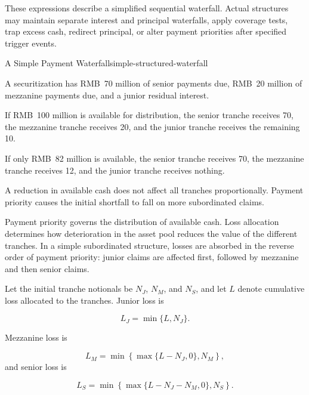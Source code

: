 These expressions describe a simplified sequential waterfall. Actual structures may maintain separate interest and principal waterfalls, apply coverage tests, trap excess cash, redirect principal, or alter payment priorities after specified trigger events.

\begin{example}{A Simple Payment Waterfall}{simple-structured-waterfall}

A securitization has RMB~70 million of senior payments due, RMB~20 million of mezzanine payments due, and a junior residual interest.

If RMB~100 million is available for distribution, the senior tranche receives 70, the mezzanine tranche receives 20, and the junior tranche receives the remaining 10.

If only RMB~82 million is available, the senior tranche receives 70, the mezzanine tranche receives 12, and the junior tranche receives nothing.

A reduction in available cash does not affect all tranches proportionally. Payment priority causes the initial shortfall to fall on more subordinated claims.

\end{example}

Payment priority governs the distribution of available cash. Loss allocation determines how deterioration in the asset pool reduces the value of the different tranches. In a simple subordinated structure, losses are absorbed in the reverse order of payment priority: junior claims are affected first, followed by mezzanine and then senior claims.

Let the initial tranche notionals be \(N_J\), \(N_M\), and \(N_S\), and let \(L\) denote cumulative loss allocated to the tranches. Junior loss is

\begin{equation}
L_J
=
\min\{L,N_J\}.
\label{eq:ch20-junior-loss}
\end{equation}

Mezzanine loss is

\begin{equation}
L_M
=
\min\left\{
\max\{L-N_J,0\},
N_M
\right\},
\label{eq:ch20-mezz-loss}
\end{equation}
and senior loss is

\begin{equation}
L_S
=
\min\left\{
\max\{L-N_J-N_M,0\},
N_S
\right\}.
\label{eq:ch20-senior-loss}
\end{equation}

